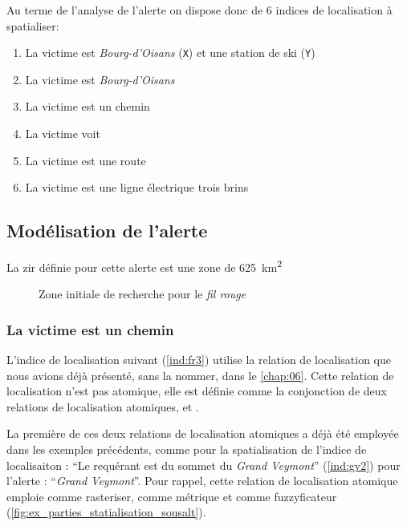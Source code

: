 Au terme de l'analyse de l'alerte on dispose donc de 6 indices de
localisation à spatialiser:
% 
\begin{enumerate}
\item \label{ind:fr1} La victime est
  \emph{Bourg-d'Oisans} (\texttt{X}) et une station de ski
  (\texttt{Y})
\item \label{ind:fr2} La victime est
   \emph{Bourg-d'Oisans} 
\item \label{ind:fr3} La victime est  un
  chemin
\item \label{ind:fr4} La victime voit
\item \label{ind:fr5} La victime est  une
  route
\item \label{ind:fr6} La victime est  une
  ligne électrique trois brins
\end{enumerate}



\subsection{Modélisation de l'alerte}
\label{subsec:9-4-2}

La \ac{zir} définie pour cette alerte est une zone de
\SI{625}{\kilo\meter\squared}

\begin{figure}
  \centering
  
  \caption{Zone initiale de recherche pour le \emph{fil rouge}}
  \label{fig:zir_fil_rouge}
\end{figure}

\subsubsection{La victime est \protect{} un chemin}

L'indice de localisation suivant (\ref{ind:fr3}) utilise la relation
de localisation  que nous avions déjà
présenté, sans la nommer, dans le \autoref{chap:06}. Cette relation de
localisation n'est pas atomique, elle est définie comme la conjonction
de deux relations de localisation atomiques,
 et .

La première de ces deux relations de localisation atomiques
 a déjà été employée dans les exemples
précédents, comme pour la spatialisation de l'indice de localisaiton :
\enquote{Le requérant est  du sommet du
  \emph{Grand Veymont}} (\ref{ind:gv2}) pour l'alerte :
\enquote{\emph{Grand Veymont}}. Pour rappel, cette relation de
localisation atomique emploie  comme rasteriser,
 comme métrique et
 comme fuzzyficateur
(\autoref{fig:ex_parties_statialisation_sousalt}).

